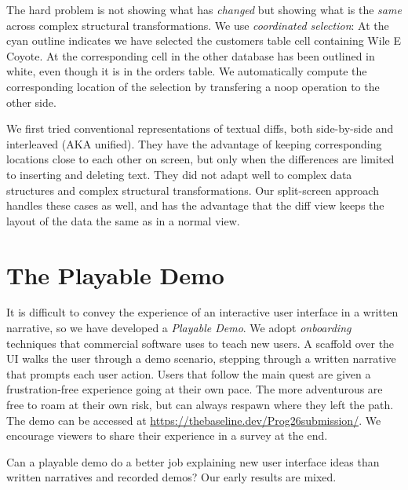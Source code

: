 \documentclass[english,submission]{programming}
\theoremstyle{definition}
\begin{document}
The hard problem is not showing what has \textit{changed} but showing what is the \textit{same} across complex structural transformations.
We use \textit{coordinated selection}:  At  the cyan outline indicates we have selected the \textsf{customers} table cell containing \textsf{Wile E Coyote}. At  the corresponding cell in the other database has been outlined in white, even though it is in the \textsf{orders} table. We automatically compute the corresponding location of the selection by transfering a \textsf{noop} operation to the other side.

We first tried conventional representations of textual diffs, both side-by-side and interleaved (AKA unified). They have the advantage of keeping corresponding locations close to each other on screen, but only when the differences are limited to inserting and deleting text. They did not adapt well to complex data structures and complex structural transformations. Our split-screen approach handles these cases as well, and has the advantage that the diff view keeps the layout of the data the same as in a normal view.



\section{The Playable Demo}\label{demo}

It is difficult to convey the experience of an interactive user interface in a written narrative, so we have developed a \textit{Playable Demo}. We adopt \textit{onboarding} techniques that commercial software uses to teach new users. A scaffold over the UI walks the user through a demo scenario, stepping through a written narrative that prompts each user action. Users that follow the main quest are given a frustration-free experience going at their own pace. The more adventurous are free to roam at their own risk, but can always respawn where they left the path. The demo can be accessed at \url{https://thebaseline.dev/Prog26submission/}. We encourage viewers to share their experience in a survey at the end.

Can a playable demo do a better job explaining new user interface ideas than
written narratives and recorded demos? Our early results are mixed.
\end{document}
